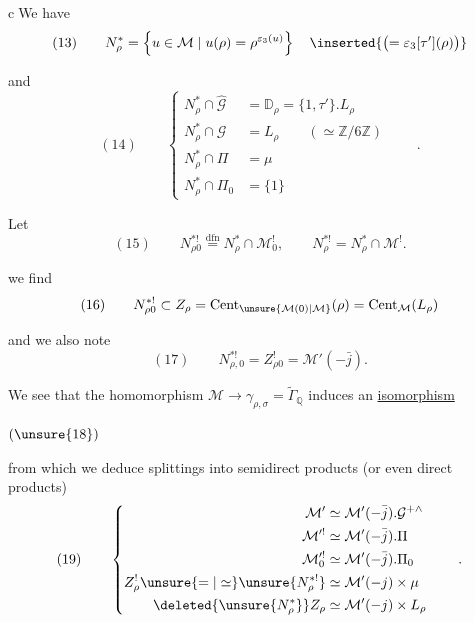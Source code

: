 \textcircled{c}\quad We have
\[
(13)\qquad
N_\rho^*=\left\{u\in\mathcal M\mid u(\rho)=\rho^{\varepsilon_3(u)}\right\}
\quad\inserted{\bigl(=\varepsilon_3[\tau'](\rho)\bigr)}
\]

and
\[
(14)\qquad
\left\{\begin{aligned}
N_\rho^*\cap\widehat{\mathcal G}
  &=\mathbb D_\rho=\{1,\tau'\}.L_\rho\\
N_\rho^*\cap\mathcal G
  &=L_\rho\qquad(\simeq\mathbb Z/6\mathbb Z)\\
N_\rho^*\cap\Pi&=\mu\\
N_\rho^*\cap\Pi_0&=\{1\}
\end{aligned}\right.\qquad .
\]


Let
\[
(15)\qquad
N_{\rho0}^{*!}\overset{\mathrm{dfn}}=N_\rho^*\cap\mathcal M_0^!,
\qquad N_\rho^{*!}=N_\rho^*\cap\mathcal M^!.
\]

we find
\[
(16)\qquad
N_{\rho0}^{*!}\subset Z_\rho
=\operatorname{Cent}_{\unsure{\mathcal M(0)|\mathcal M}}(\rho)
=\operatorname{Cent}_{\mathcal M}(L_\rho)
\]

and we also note
\[
(17)\qquad N_{\rho,0}^{*!}=Z_{\rho0}^{!}=\mathcal M'(-\bar j).
\]

We see that the homomorphism $\mathcal M\to\gamma_{\rho,\sigma}
=\widetilde{\Gamma}_{\mathbb Q}$ induces an \uline{isomorphism}

\( (\unsure{18}) \)\quad
{}

from which we deduce splittings into semidirect products
(or even direct products)
\[
(19)\qquad
\left\{\begin{aligned}
\mathcal M'&\simeq\mathcal M'(-\bar j).\mathcal G^{+\wedge}\\
\mathcal M^{\prime!}&\simeq\mathcal M'(-\bar j).\Pi\\
\mathcal M_0^{\prime!}&\simeq\mathcal M'(-\bar j).\Pi_0\\
Z_\rho^!\unsure{=|\simeq}\unsure{N_\rho^{*!}}
  &\simeq\mathcal M'(-j)\times\mu\\
\deleted{\unsure{N_\rho^*}}Z_\rho
  &\simeq\mathcal M'(-j)\times L_\rho
\end{aligned}\right.\qquad .
\]

